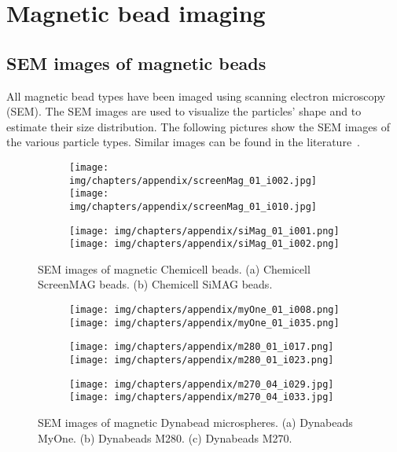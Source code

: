\chapter{Magnetic bead imaging}\label{sec:magneticBeadImaging}
\section{SEM images of magnetic beads}
All magnetic bead types have been imaged using scanning electron microscopy (SEM). The SEM images are used to visualize the particles' shape and to estimate their size distribution. The following pictures show the SEM images of the various particle types. Similar images can be found in the literature~\cite{Herrasti2016}.
\begin{figure}[htb]
	\centering
    \begin{subfigure}[b]{\textwidth}
	    	\centering
		\texttt{[image: img/chapters/appendix/screenMag\_01\_i002.jpg]}
		\texttt{[image: img/chapters/appendix/screenMag\_01\_i010.jpg]}
        \caption{}
	\end{subfigure}
    	\begin{subfigure}[b]{\textwidth}
    		\centering
		\texttt{[image: img/chapters/appendix/siMag\_01\_i001.png]}
		\texttt{[image: img/chapters/appendix/siMag\_01\_i002.png]}
		\caption{}
	\end{subfigure}
	\caption[SEM images of magnetic Chemicell beads]{SEM images of magnetic Chemicell beads. (a) Chemicell ScreenMAG beads. (b) Chemicell SiMAG beads.}
\label{fig:}
\end{figure}

\begin{figure}[htb]
	\centering
	\begin{subfigure}[b]{\textwidth}
		\centering
		\texttt{[image: img/chapters/appendix/myOne\_01\_i008.png]}
		\texttt{[image: img/chapters/appendix/myOne\_01\_i035.png]}
		\caption{}
	\end{subfigure}
	\begin{subfigure}[b]{\textwidth}
		\centering
		\texttt{[image: img/chapters/appendix/m280\_01\_i017.png]}
		\texttt{[image: img/chapters/appendix/m280\_01\_i023.png]}
		\caption{}
	\end{subfigure}
	\begin{subfigure}[b]{\textwidth}
		\centering
		\texttt{[image: img/chapters/appendix/m270\_04\_i029.jpg]}
		\texttt{[image: img/chapters/appendix/m270\_04\_i033.jpg]}
		\caption{}
	\end{subfigure}
	\caption[SEM images of magnetic Dynabead microspheres]{SEM images of magnetic Dynabead microspheres. (a) Dynabeads MyOne. (b) Dynabeads M280. (c) Dynabeads M270.}
\end{figure}

